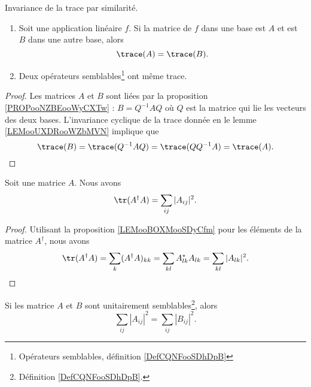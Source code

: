 \begin{proposition}      \label{PROPooRMYQooWkEpJJ}
    Invariance de la trace par similarité.
    \begin{enumerate}
        \item
	Soit une application linéaire \( f\). Si la matrice de \( f\) dans une base est \( A\) et est \( B\) dans une autre base, alors
	\begin{equation}
		\trace(A)=\trace(B).
	\end{equation}
        \item
            Deux opérateurs semblables\footnote{Opérateurs semblables, définition \ref{DefCQNFooSDhDpB}} ont même trace.
    \end{enumerate}
\end{proposition}

\begin{proof}
	Les matrices \( A\) et \( B\) sont liées par la proposition \ref{PROPooNZBEooWyCXTw} : \( B=Q^{-1}AQ\) où \( Q\) est la matrice qui lie les vecteurs des deux bases. L'invariance cyclique de la trace donnée en le lemme \ref{LEMooUXDRooWZbMVN} implique que
	\begin{equation}
		\trace(B)=\trace(Q^{-1}AQ)=\trace(QQ^{-1}A)=\trace(A).
	\end{equation}
\end{proof}

\begin{lemma}       \label{LEMooXXEYooKHyQjb}
    Soit une matrice \( A\). Nous avons
    \begin{equation}
        \tr(A^{\dag} A)=\sum_{ij}| A_{ij} |^2.
    \end{equation}
\end{lemma}

\begin{proof}
    Utilisant la proposition \ref{LEMooBOXMooSDyCfm} pour les éléments de la matrice \( A^{\dag}\), nous avons
    \begin{equation}  
            \tr(A^{\dag}A)=\sum_k(A^{\dag}A)_{kk}
            =\sum_{kl}A^*_{lk}A_{lk}
            =\sum_{kl}| A_{lk} |^2.
    \end{equation}
\end{proof}

\begin{lemma}     \label{LEMooQXFQooLGPcIt}
    Si les matrice \( A\) et \( B\) sont unitairement semblables\footnote{Définition \ref{DefCQNFooSDhDpB}.}, alors
    \begin{equation}
        \sum_{ij}| A_{ij} |^2=\sum_{ij}| B_{ij} |^2.
    \end{equation}
\end{lemma}

